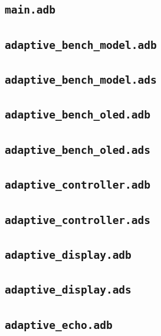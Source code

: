 \subsection*{\texttt{main.adb}}

\subsection*{\texttt{adaptive\_bench\_model.adb}}

\subsection*{\texttt{adaptive\_bench\_model.ads}}

\subsection*{\texttt{adaptive\_bench\_oled.adb}}

\subsection*{\texttt{adaptive\_bench\_oled.ads}}

\subsection*{\texttt{adaptive\_controller.adb}}

\subsection*{\texttt{adaptive\_controller.ads}}

\subsection*{\texttt{adaptive\_display.adb}}

\subsection*{\texttt{adaptive\_display.ads}}

\subsection*{\texttt{adaptive\_echo.adb}}

